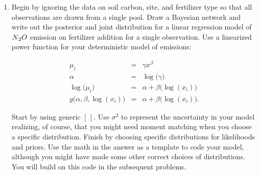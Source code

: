 \documentclass[12pt, oneside]{article}
\newif\ifanswers
\begin{document}
\begin{enumerate} [leftmargin=*] 
\item Begin by ignoring the data on soil carbon, site, and fertilizer type so that all observations are drawn from a single pool. Draw a Bayesian network and write out the posterior and joint distribution for a linear regression model of $N\textsubscript{2}O$ emission on fertilizer addition for a single observation. Use a linearized power function for your deterministic model of emissions:

\begin{eqnarray*}
\mu_{i} & = & \gamma x^{\beta}\\
\alpha & = & \log\big(\gamma\big)\\
\log\big(\mu_{i}\big) & = & \alpha+\beta\big(\log(x_i)\big)\\
g\big(\alpha,\beta,\log(x_i)\big) & = & \alpha+\beta\big(\log(x_i)\big).
\end{eqnarray*}

Start by using generic $[\,]$. Use $\sigma^{2}$ to represent the uncertainty in your model realizing, of course, that you might need moment matching when you choose a specific distribution.  Finish by choosing specific distributions for likelihoods and priors.  Use the math in the answer as a template to code your model, although you might have made some other correct choices of distributions.  You will build on this code in the subsequent problems.
\ifanswers
\begin{center}
\texttt{[image: DAG1.png]}
\end{center}
\begin{eqnarray*}
\mu_{i} & = & \gamma x^{\beta}\\
\alpha & = & \log\big(\gamma\big)\\
\log\big(\mu_{i}\big) & = & \alpha+\beta\big(\log(x_i)\big)\\
g\big(\alpha,\beta,\log(x_i)\big) & = & \alpha+\beta\big(\log(x_i)\big)\\
\big[\alpha,\beta,\sigma \mid y_{i}\big] & \propto & \big[\log(y_{i})\mid g\big(\alpha,\beta,\log(x_i)\big),\sigma^{2}\big][\alpha]\big[\beta\big]\big[\sigma \big]\label{eq:mean model for N02 intecept-3}
\end{eqnarray*}	
\fi

\ifanswers
\begin{center}
\end{center}
\begin{align*}
[\alpha,\beta,\sigma \mid \mathbf{y}]&\propto\prod_{i=1}^{n}\text{normal}\big(\log(y_i)\mid g\big(\alpha,\beta,\log(x_i),\sigma^2\big)\\
&\times\text{normal}(\alpha\mid 0,10000)\text{normal}(\beta \mid 0,10000)\\
&\times\text{uniform}(\sigma\mid0,200)
\end{align*}
\fi


\end{enumerate}
\end{document}
